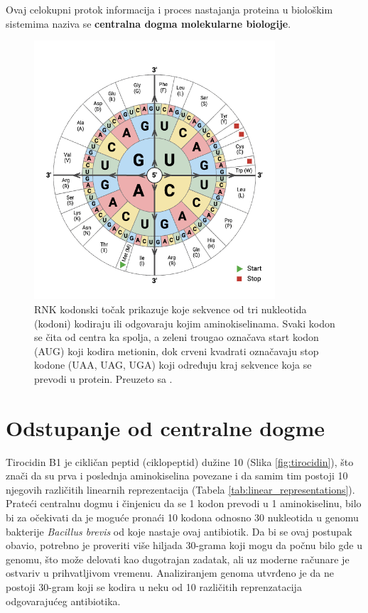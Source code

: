 \documentclass[12pt,oneside]{memoir}
\begin{document}
Ovaj celokupni protok informacija i proces nastajanja proteina u biološkim sistemima naziva se \textbf{centralna dogma molekularne biologije}.

\begin{figure}[H]
  \centering
  \includegraphics[width=0.8\textwidth]{images/RNA-Codon-Wheel.png}
  \caption{RNK kodonski točak prikazuje koje sekvence od tri nukleotida (kodoni) kodiraju ili odgovaraju kojim aminokiselinama. Svaki kodon se čita od centra ka spolja, a zeleni trougao označava start kodon (AUG) koji kodira metionin, dok crveni kvadrati označavaju stop kodone (UAA, UAG, UGA) koji određuju kraj sekvence koja se prevodi u protein. Preuzeto sa \cite{codon_chart}.}
  \label{fig:codon-wheel}
\end{figure}


\section{Odstupanje od centralne dogme}
Tirocidin B1 je cikličan peptid (ciklopeptid) dužine 10 (Slika \ref{fig:tirocidin}), što znači da su prva i poslednja aminokiselina povezane i da samim tim postoji 10 njegovih različitih linearnih reprezentacija (Tabela \ref{tab:linear_representations}). Prateći centralnu dogmu i činjenicu da se 1 kodon prevodi u 1 aminokiselinu, bilo bi za očekivati da je moguće pronaći 10 kodona odnosno 30 nukleotida u genomu bakterije \emph{Bacillus brevis} od koje nastaje ovaj antibiotik. Da bi se ovaj postupak obavio, potrebno je proveriti više hiljada 30-grama koji mogu da počnu bilo gde u genomu, što može delovati kao dugotrajan zadatak, ali uz moderne računare je ostvariv u prihvatljivom vremenu. Analiziranjem genoma utvrđeno je da ne postoji 30-gram koji se kodira u neku od 10 različitih reprenzatacija odgovarajućeg antibiotika.
\end{document}
